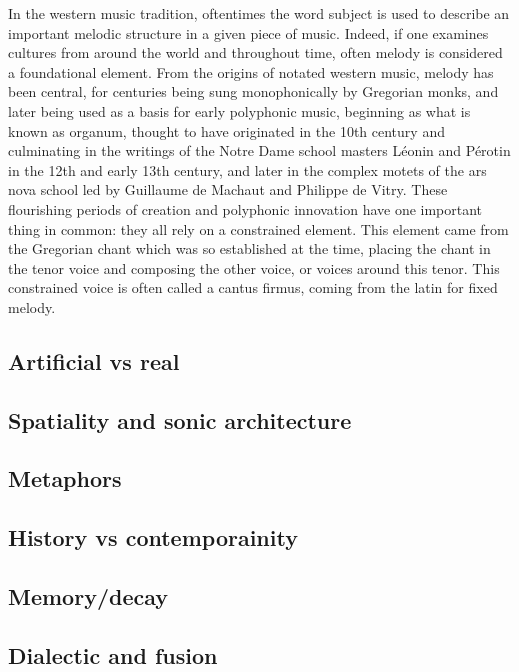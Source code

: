 \documentclass[12pt,twoside,maitrise]{dms}
\theoremstyle{definition}
\begin{document}
In the western music tradition, oftentimes the word subject is used to describe an important melodic structure in a given piece of music.
Indeed, if one examines cultures from around the world and throughout time, often melody is considered a foundational element.
From the origins of notated western music, melody has been central, for centuries being sung monophonically by Gregorian monks, and later being used as a basis for early polyphonic music, beginning as what is known as organum, thought to have originated in the 10th century and culminating in the writings of the Notre Dame school masters Léonin and Pérotin in the 12th and early 13th century, and later in the complex motets of the ars nova school led by Guillaume de Machaut and Philippe de Vitry.
These flourishing periods of creation and polyphonic innovation have one important thing in common: they all rely on a constrained element.
This element came from the Gregorian chant which was so established at the time, placing the chant in the tenor voice and composing the other voice, or voices around this tenor.
This constrained voice is often called a cantus firmus, coming from the latin for fixed melody.

\subsection{Artificial vs real}

\subsection{Spatiality and sonic architecture}

\subsection{Metaphors}

\subsection{History vs contemporainity}

\subsection{Memory/decay}

\subsection{Dialectic and fusion}
\end{document}

